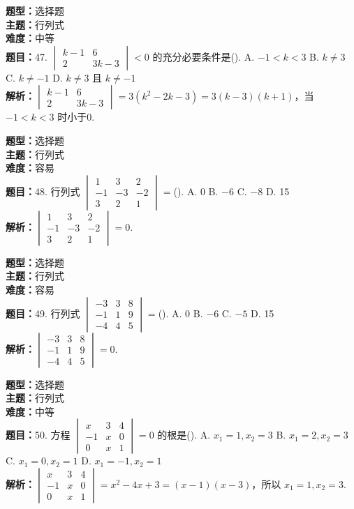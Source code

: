 \documentclass{ctexart}
\newenvironment{question}[5]{%
	\noindent\textbf{题型：}#1\\
	\textbf{主题：}#2\\
	\textbf{难度：}#3\\
	\textbf{题目：}#4\\
	\textbf{解析：}#5\\
	\vspace{1em}
}{}
\begin{document}
	\begin{question}
		{选择题}
		{行列式}
		{中等}
		{47. \(\begin{vmatrix} k-1 & 6 \\ 2 & 3k-3\end{vmatrix}<0\) 的充分必要条件是(\qquad). 
			A. \(-1<k<3\) \quad B. \(k\neq3\) \quad C. \(k\neq-1\) \quad D. \(k\neq3\) 且 \(k\neq-1\)}
		{\(\begin{vmatrix} k-1 & 6 \\ 2 & 3k-3\end{vmatrix} = 3(k^2 - 2k - 3) = 3(k - 3)(k + 1)\)，当 \(-1<k<3\) 时小于0. }
	\end{question}
	
	\begin{question}
		{选择题}
		{行列式}
		{容易}
		{48. 行列式 \(\begin{vmatrix} 1 & 3 & 2 \\ -1 & -3 & -2 \\ 3 & 2 & 1\end{vmatrix}=\)(\qquad). 
			A. 0 \quad B. \(-6\) \quad C. \(-8\) \quad D. 15}
		{\(\begin{vmatrix} 1 & 3 & 2 \\ -1 & -3 & -2 \\ 3 & 2 & 1\end{vmatrix}=0\). }
	\end{question}
	
	\begin{question}
		{选择题}
		{行列式}
		{容易}
		{49. 行列式 \(\begin{vmatrix} -3 & 3 & 8 \\ -1 & 1 & 9 \\ -4 & 4 & 5\end{vmatrix}=\)(\qquad). 
			A. 0 \quad B. \(-6\) \quad C. \(-5\) \quad D. 15}
		{\(\begin{vmatrix} -3 & 3 & 8 \\ -1 & 1 & 9 \\ -4 & 4 & 5\end{vmatrix}=0\). }
	\end{question}
	
	\begin{question}
		{选择题}
		{行列式}
		{中等}
		{50. 方程 \(\begin{vmatrix} x & 3 & 4 \\ -1 & x & 0 \\ 0 & x & 1\end{vmatrix}=0\) 的根是(\qquad). 
			A. \(x_1=1, x_2=3\) \quad B. \(x_1=2, x_2=3\) \quad C. \(x_1=0, x_2=1\) \quad D. \(x_1=-1, x_2=1\)}
		{\(\begin{vmatrix} x & 3 & 4 \\ -1 & x & 0 \\ 0 & x & 1\end{vmatrix} = x^2 - 4x + 3 = (x - 1)(x - 3)\)，所以 \(x_1=1, x_2=3\). }
	\end{question}
	
\end{document}

